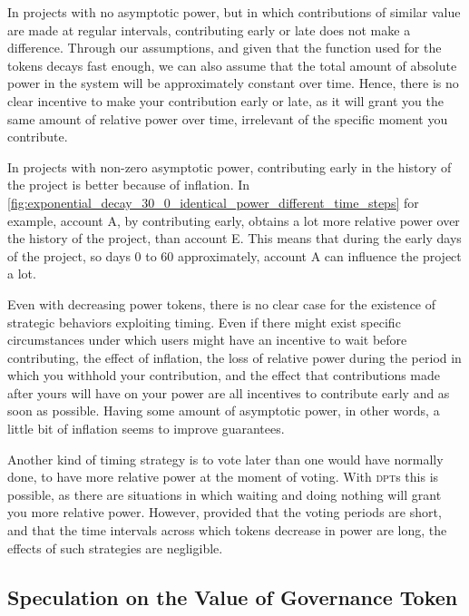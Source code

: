 In projects with no asymptotic power, but in which contributions of similar value are made at regular intervals, contributing early or late does not make a difference.
Through our assumptions, and given that the function used for the tokens decays fast enough, we can also assume that the total amount of absolute power in the system will be approximately constant over time.
Hence, there is no clear incentive to make your contribution early or late, as it will grant you the same amount of relative power over time, irrelevant of the specific moment you contribute.

In projects with non-zero asymptotic power, contributing early in the history of the project is better because of inflation.
In \cref{fig:exponential_decay_30_0_identical_power_different_time_steps} for example, account A, by contributing early, obtains a lot more relative power over the history of the project, than account E.
This means that during the early days of the project, so days 0 to 60 approximately, account A can influence the project a lot.

Even with decreasing power tokens, there is no clear case for the existence of strategic behaviors exploiting timing.
Even if there might exist specific circumstances under which users might have an incentive to wait before contributing, the effect of inflation, the loss of relative power during the period in which you withhold your contribution, and the effect that contributions made after yours will have on your power are all incentives to contribute early and as soon as possible.
Having some amount of asymptotic power, in other words, a little bit of inflation seems to improve guarantees.

Another kind of timing strategy is to vote later than one would have normally done, to have more relative power at the moment of voting.
With \textsc{dpt}s this is possible, as there are situations in which waiting and doing nothing will grant you more relative power.
However, provided that the voting periods are short, and that the time intervals across which tokens decrease in power are long, the effects of such strategies are negligible.

\subsection{Speculation on the Value of Governance Token}

